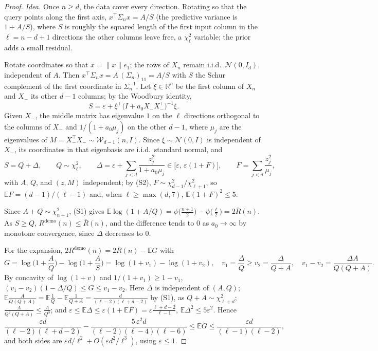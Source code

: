 \documentclass{article}
\newcommand{\E}{\mathbb{E}}
\newcommand{\R}{\mathbb{R}}
\begin{document}
\begin{proof}
\emph{Idea.} Once $n \ge d$, the data cover every direction. Rotating so that the query points along the first axis, $x^\top \Sigma_n x = A/S$ (the predictive variance is $1 + A/S$), where $S$ is roughly the squared length of the first input column in the $\ell = n - d + 1$ directions the other columns leave free, a $\chi^2_\ell$ variable; the prior adds a small residual.

Rotate coordinates so that $x = \|x\| e_1$; the rows of $X_n$ remain i.i.d.\ $\mathcal{N}(0, I_d)$, independent of $A$. Then $x^\top \Sigma_n x = A\,(\Sigma_n)_{11} = A/S$ with $S$ the Schur complement of the first coordinate in $\Sigma_n^{-1}$. Let $\xi \in \R^n$ be the first column of $X_n$ and $X_-$ its other $d-1$ columns; by the Woodbury identity,
\[
S = \varepsilon + \xi^\top \big(I + a_0 X_- X_-^\top\big)^{-1} \xi .
\]
Given $X_-$, the middle matrix has eigenvalue $1$ on the $\ell$ directions orthogonal to the columns of $X_-$ and $1/(1 + a_0 \mu_j)$ on the other $d - 1$, where $\mu_j$ are the eigenvalues of $M = X_-^\top X_- \sim \mathcal{W}_{d-1}(n, I)$. Since $\xi \sim \mathcal{N}(0, I)$ is independent of $X_-$, its coordinates in that eigenbasis are i.i.d.\ standard normal, and
\[
S = Q + \Delta, \qquad Q \sim \chi^2_\ell, \qquad
\Delta = \varepsilon + \sum_{j < d} \frac{z_j^2}{1 + a_0 \mu_j} \in \big[\varepsilon,\, \varepsilon(1 + F)\big], \qquad F = \sum_{j < d} \frac{z_j^2}{\mu_j},
\]
with $A$, $Q$, and $(z, M)$ independent; by (S2), $F \sim \chi^2_{d-1} / \chi^2_{\ell+1}$, so $\E F = (d-1)/(\ell-1)$ and, when $\ell \ge \max(d, 7)$, $\E (1+F)^2 \le 5$.

Since $A + Q \sim \chi^2_{n+1}$, (S1) gives $\E \log(1 + A/Q) = \psi\big(\tfrac{n+1}{2}\big) - \psi\big(\tfrac{\ell}{2}\big) = 2\bar R(n)$. As $S \ge Q$, $R^{\mathrm{demo}}(n) \le \bar R(n)$, and the difference tends to $0$ as $a_0 \to \infty$ by monotone convergence, since $\Delta$ decreases to $0$.

For the expansion, $2R^{\mathrm{demo}}(n) = 2\bar R(n) - \E G$ with
\[
G = \log\Big(1 + \frac{A}{Q}\Big) - \log\Big(1 + \frac{A}{S}\Big) = \log(1 + v_1) - \log(1 + v_2), \quad v_1 = \frac{\Delta}{Q} \ge v_2 = \frac{\Delta}{Q + A}, \quad v_1 - v_2 = \frac{\Delta A}{Q(Q+A)} .
\]
By concavity of $\log(1+v)$ and $1/(1+v_1) \ge 1 - v_1$, $(v_1 - v_2)(1 - \Delta/Q) \le G \le v_1 - v_2$. Here $\Delta$ is independent of $(A, Q)$; $\E \frac{A}{Q(Q+A)} = \E\frac1Q - \E\frac{1}{Q+A} = \frac{d}{(\ell-2)(\ell+d-2)}$ by (S1), as $Q + A \sim \chi^2_{\ell+d}$; $\frac{A}{Q^2(Q+A)} \le \frac{A}{Q^3}$; and $\varepsilon \le \E\Delta \le \varepsilon(1 + \E F) = \varepsilon\frac{\ell+d-2}{\ell-1}$, $\E \Delta^2 \le 5\varepsilon^2$. Hence
\[
\frac{\varepsilon d}{(\ell-2)(\ell+d-2)} - \frac{5\,\varepsilon^2 d}{(\ell-2)(\ell-4)(\ell-6)} \le \E G \le \frac{\varepsilon d}{(\ell-1)(\ell-2)} ,
\]
and both sides are $\varepsilon d / \ell^2 + O(\varepsilon d^2 / \ell^3)$, using $\varepsilon \le 1$.
\end{proof}
\end{document}
